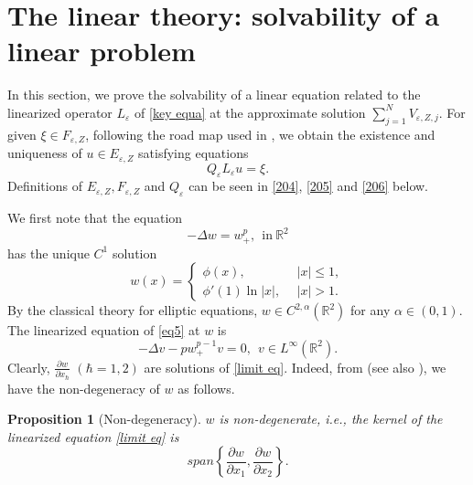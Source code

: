 \documentclass[12pt,reqno]{amsart}
\numberwithin{equation}{section}
\newtheorem{proposition}[theorem]{Proposition}
\theoremstyle{definition}
\theoremstyle{remark}
\begin{document}
\section{The linear theory: solvability of  a linear problem}
In this section,  we prove the solvability of  a linear equation related to the linearized operator $ L_\varepsilon $ of \eqref{key equa} at the approximate solution $ \sum_{j=1}^NV_{\varepsilon, Z,j} $. For given $ \xi\in F_{\varepsilon, Z} $, following the road map used in \cite{CPY}, we obtain the existence and uniqueness of $ u\in E_{\varepsilon,Z} $ satisfying equations
\begin{equation*} 
 Q_\varepsilon L_\varepsilon u=\xi.
\end{equation*}
Definitions of $ E_{\varepsilon,Z}, F_{\varepsilon,Z} $ and $ Q_\varepsilon $ can be seen in \eqref{204}, \eqref{205} and \eqref{206} below.

We first note that the equation
\begin{equation}\label{eq5}
-\Delta w=w^p_+,\ \ \text{in}\ \mathbb{R}^2 
\end{equation}
has the unique $ C^1 $ solution 
\begin{equation*}
w(x)=\begin{cases}
\phi(x),\ \ &|x|\leq 1,\\
\phi'(1)\ln|x|,\ \ &|x|> 1.
\end{cases}
\end{equation*}
By the classical theory for elliptic equations, $ w\in C^{2,\alpha}(\mathbb{R}^2) $ for any $ \alpha\in(0,1) $. The linearized equation of \eqref{eq5} at $ w $ is
\begin{equation}\label{limit eq}
-\Delta v-pw^{p-1}_+v=0, \ \ v\in L^{\infty}(\mathbb{R}^2).
\end{equation}
Clearly, $ \frac{\partial w}{\partial x_\hbar} $ $(\hbar=1,2) $  are solutions of \eqref{limit eq}. Indeed, from \cite{DY} (see also \cite{CLW}), we have the non-degeneracy of $ w $ as follows.
\begin{proposition}[Non-degeneracy]\label{Non-degenerate}
$ w $ is non-degenerate, i.e., the kernel of the linearized equation \eqref{limit eq} is $$ span\left \{\frac{\partial w}{\partial x_1}, \frac{\partial w}{\partial x_2}\right \}. $$
\end{proposition}
\end{document}
